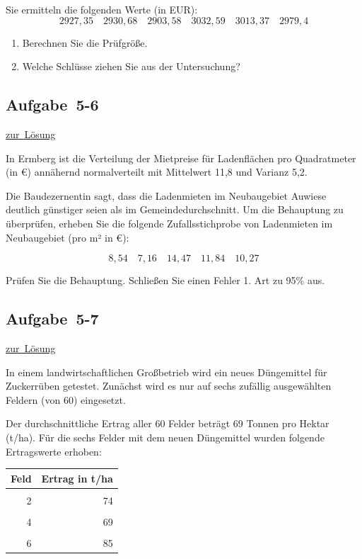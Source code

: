 \documentclass[
  11pt,
  ngerman,
  a4paper,
]{report}
\providecommand{\tightlist}{%
  \setlength{\itemsep}{0pt}\setlength{\parskip}{0pt}}
\begin{document}
Sie ermitteln die folgenden Werte (in EUR):
\[
2927{,}35\quad2930{,}68\quad2903{,}58\quad3032{,}59\quad3013{,}37\quad2979{,}4
\]

\begin{enumerate}
\def\labelenumi{\alph{enumi})}
\tightlist
\item
  Berechnen Sie die Prüfgröße.
\item
  Welche Schlüsse ziehen Sie aus der Untersuchung?
\end{enumerate}

\hypertarget{aufgabe-5-6}{%
\subsection{Aufgabe~5-6}\label{aufgabe-5-6}}

\protect\hyperlink{loesung-5-6}{zur~Lösung}

In Ermberg ist die Verteilung der Mietpreise für Ladenflächen pro Quadratmeter (in €) annähernd normalverteilt mit Mittelwert 11,8 und Varianz 5,2.

Die Baudezernentin sagt, dass die Ladenmieten im Neubaugebiet Auwiese deutlich günstiger seien als im Gemeindedurchschnitt. Um die Behauptung zu überprüfen, erheben Sie die folgende Zufallsstichprobe von Ladenmieten im Neubaugebiet (pro m² in €):

\[8{,}54\quad7{,}16\quad14{,}47\quad11{,}84\quad10{,}27\]

Prüfen Sie die Behauptung. Schließen Sie einen Fehler 1. Art zu 95\% aus.

\hypertarget{aufgabe-5-7}{%
\subsection{Aufgabe~5-7}\label{aufgabe-5-7}}

\protect\hyperlink{loesung-5-7}{zur~Lösung}

In einem landwirtschaftlichen Großbetrieb wird ein neues Düngemittel für Zuckerrüben getestet. Zunächst wird es nur auf sechs zufällig ausgewählten Feldern (von 60) eingesetzt.

Der durchschnittliche Ertrag aller 60 Felder beträgt 69 Tonnen pro Hektar (t/ha). Für die sechs Felder mit dem neuen Düngemittel wurden folgende Ertragswerte erhoben:

\begin{table}
\centering
\begin{tabular}{rr}
\toprule
\textbf{Feld} & \textbf{Ertrag in t/ha}\\
\midrule
\cellcolor{gray!6}{1} & \cellcolor{gray!6}{93}\\
2 & 74\\
\cellcolor{gray!6}{3} & \cellcolor{gray!6}{65}\\
4 & 69\\
\cellcolor{gray!6}{5} & \cellcolor{gray!6}{89}\\
6 & 85\\
\bottomrule
\end{tabular}
\end{table}
\end{document}
